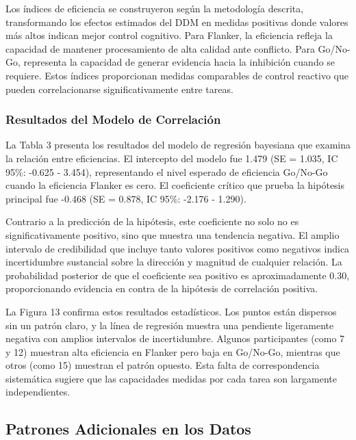 \documentclass[
  spanish,
  10pt,
]{article}
\begin{document}
Los índices de eficiencia se construyeron según la metodología descrita,
transformando los efectos estimados del DDM en medidas positivas donde
valores más altos indican mejor control cognitivo. Para Flanker, la
eficiencia refleja la capacidad de mantener procesamiento de alta
calidad ante conflicto. Para Go/No-Go, representa la capacidad de
generar evidencia hacia la inhibición cuando se requiere. Estos índices
proporcionan medidas comparables de control reactivo que pueden
correlacionarse significativamente entre tareas.

\subsubsection{Resultados del Modelo de
Correlación}\label{resultados-del-modelo-de-correlaciuxf3n}

La Tabla 3 presenta los resultados del modelo de regresión bayesiana que
examina la relación entre eficiencias. El intercepto del modelo fue
1.479 (SE = 1.035, IC 95\%: -0.625 - 3.454), representando el nivel
esperado de eficiencia Go/No-Go cuando la eficiencia Flanker es cero. El
coeficiente crítico que prueba la hipótesis principal fue -0.468 (SE =
0.878, IC 95\%: -2.176 - 1.290).

Contrario a la predicción de la hipótesis, este coeficiente no solo no
es significativamente positivo, sino que muestra una tendencia negativa.
El amplio intervalo de credibilidad que incluye tanto valores positivos
como negativos indica incertidumbre sustancial sobre la dirección y
magnitud de cualquier relación. La probabilidad posterior de que el
coeficiente sea positivo es aproximadamente 0.30, proporcionando
evidencia en contra de la hipótesis de correlación positiva.

La Figura 13 confirma estos resultados estadísticos. Los puntos están
dispersos sin un patrón claro, y la línea de regresión muestra una
pendiente ligeramente negativa con amplios intervalos de incertidumbre.
Algunos participantes (como 7 y 12) muestran alta eficiencia en Flanker
pero baja en Go/No-Go, mientras que otros (como 15) muestran el patrón
opuesto. Esta falta de correspondencia sistemática sugiere que las
capacidades medidas por cada tarea son largamente independientes.

\subsection{Patrones Adicionales en los
Datos}\label{patrones-adicionales-en-los-datos}
\end{document}
